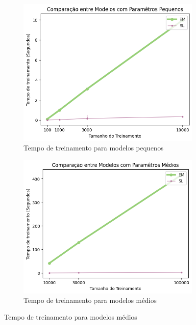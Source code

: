 \documentclass{subfiles}
\begin{document}
\begin{figure}
    \centering
    \begin{subfigure}[b]{0.3\linewidth}
        \centering
        \includegraphics[width=\linewidth]{Figures/resultados/small_time}
        \caption{Tempo de treinamento para modelos pequenos}
    \end{subfigure}
    \hfill
    \begin{subfigure}[b]{0.3\linewidth}
        \centering
        \includegraphics[width=\linewidth]{Figures/resultados/medium_time}
        \caption{Tempo de treinamento para modelos médios}
    \end{subfigure}

\end{figure}
\end{document}
